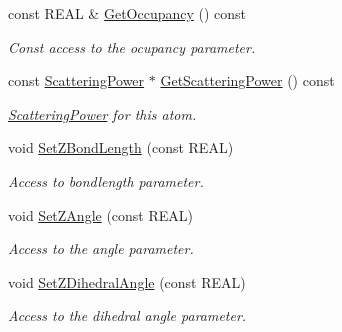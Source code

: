 \begin{DoxyCompactItemize}
\mbox{\label{class_obj_cryst_1_1_z_atom_aef939803ea1164e5d9627064fd1c4ce7}} 
const R\+E\+AL \& \mbox{\hyperlink{class_obj_cryst_1_1_z_atom_aef939803ea1164e5d9627064fd1c4ce7}{Get\+Occupancy}} () const
\begin{DoxyCompactList}\small\item\em Const access to the ocupancy parameter. \end{DoxyCompactList}\item 
\mbox{\label{class_obj_cryst_1_1_z_atom_aed52f999824604cf553cb5d41ab3ac15}} 
const \mbox{\hyperlink{class_obj_cryst_1_1_scattering_power}{Scattering\+Power}} $\ast$ \mbox{\hyperlink{class_obj_cryst_1_1_z_atom_aed52f999824604cf553cb5d41ab3ac15}{Get\+Scattering\+Power}} () const
\begin{DoxyCompactList}\small\item\em \mbox{\hyperlink{class_obj_cryst_1_1_scattering_power}{Scattering\+Power}} for this atom. \end{DoxyCompactList}\item 
\mbox{\label{class_obj_cryst_1_1_z_atom_ad4d6d810bc1bb90ae7773ac3889bd035}} 
void \mbox{\hyperlink{class_obj_cryst_1_1_z_atom_ad4d6d810bc1bb90ae7773ac3889bd035}{Set\+Z\+Bond\+Length}} (const R\+E\+AL)
\begin{DoxyCompactList}\small\item\em Access to bondlength parameter. \end{DoxyCompactList}\item 
\mbox{\label{class_obj_cryst_1_1_z_atom_a84aef5886287556191d7ca2b949160a7}} 
void \mbox{\hyperlink{class_obj_cryst_1_1_z_atom_a84aef5886287556191d7ca2b949160a7}{Set\+Z\+Angle}} (const R\+E\+AL)
\begin{DoxyCompactList}\small\item\em Access to the angle parameter. \end{DoxyCompactList}\item 
\mbox{\label{class_obj_cryst_1_1_z_atom_a17c32ebb8d2ef87b6e9a3b9323457c9f}} 
void \mbox{\hyperlink{class_obj_cryst_1_1_z_atom_a17c32ebb8d2ef87b6e9a3b9323457c9f}{Set\+Z\+Dihedral\+Angle}} (const R\+E\+AL)
\begin{DoxyCompactList}\small\item\em Access to the dihedral angle parameter. \end{DoxyCompactList}\item 

\end{DoxyCompactItemize}
